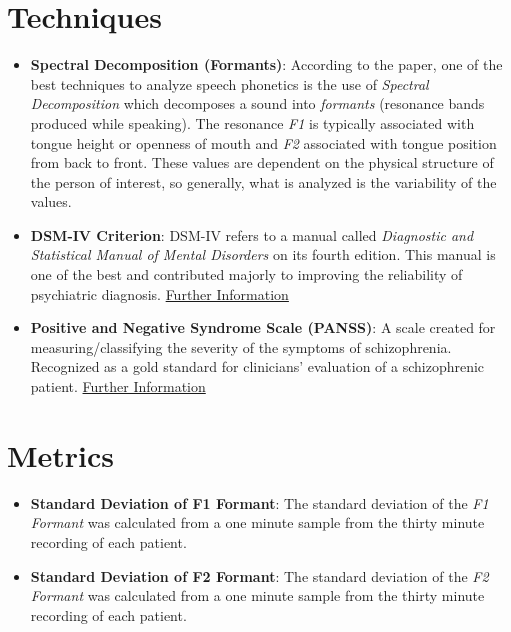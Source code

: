 \documentclass{Paper_Summary}
\begin{document}
\section{Techniques}
    \begin{itemize}
        \item \textbf{Spectral Decomposition (Formants)}: According to the paper, one of the best techniques to analyze speech phonetics is the use of \emph{Spectral Decomposition} which decomposes a sound into \emph{formants} (resonance bands produced while speaking). The resonance \emph{F1} is typically associated with tongue height or openness of mouth and \emph{F2} associated with tongue position from back to front. These values are dependent on the physical structure of the person of interest, so generally, what is analyzed is the variability of the values.
        \item \textbf{DSM-IV Criterion}: DSM-IV refers to a manual called \emph{Diagnostic and Statistical Manual of Mental Disorders} on its fourth edition. This manual is one of the best and contributed majorly to improving the reliability of psychiatric diagnosis. \href{https://en.wikipedia.org/wiki/Diagnostic_and_Statistical_Manual_of_Mental_Disorders#DSM-IV_(1994)}{Further Information}
        \item \textbf{Positive and Negative Syndrome Scale (PANSS)}: A scale created for measuring/classifying the severity of the symptoms of schizophrenia. Recognized as a gold standard for clinicians' evaluation of a schizophrenic patient. \href{https://en.wikipedia.org/wiki/Positive_and_Negative_Syndrome_Scale}{Further Information}
         
    \end{itemize}

\section{Metrics}
    \begin{itemize}
        \item \textbf{Standard Deviation of F1 Formant}: The standard deviation of the \emph{F1 Formant} was calculated from a one minute sample from the thirty minute recording of each patient. 
        \item \textbf{Standard Deviation of F2 Formant}: The standard deviation of the \emph{F2 Formant} was calculated from a one minute sample from the thirty minute recording of each patient. 
    \end{itemize}
\end{document}

